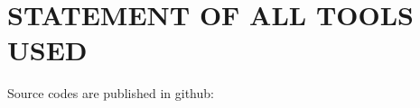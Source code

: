 \documentclass{article}
\begin{document}
\section{STATEMENT OF ALL TOOLS USED}
\label{sec:statementofalltoolsused}


Source codes are published in github: 





\vfill\pagebreak



\end{document}
